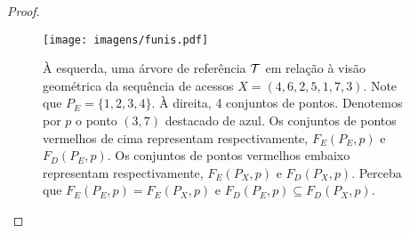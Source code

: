 \begin{proof}
\begin{comment}
            \draw[color_of_analysed_point, dashed, line width=1.5pt] (3,0) -- (3,8);
            
            
            \filldraw[black] (4,1) circle (7pt);
            \filldraw[black] (6,2) circle (7pt);
            \filldraw[red] (2,3) circle (7pt);
            \filldraw[black] (5,4) circle (7pt);
            \filldraw[red] (1,5) circle (7pt);
            \filldraw[black] (7,6) circle (7pt);
            \filldraw[color_of_analysed_point] (3,7) circle (7pt);
            \draw[black, line width=0.5pt] (0,0) rectangle (8,8);
        \end{tikzpicture}
        \begin{tikzpicture}[scale=0.45]
            \draw[very thin, gray!70] (0,0) grid (8,8);
    
            \draw[color_of_analysed_point, dashed, line width=1.5pt] (3,0) -- (3,8);
            
            
            \filldraw[red] (4,1) circle (7pt);
            \filldraw[black] (6,2) circle (7pt);
            \filldraw[black] (2,3) circle (7pt);
            \filldraw[red] (5,4) circle (7pt);
            \filldraw[black] (1,5) circle (7pt);
            \filldraw[red] (7,6) circle (7pt);
            \filldraw[color_of_analysed_point] (3,7) circle (7pt);
            \draw[black, line width=0.5pt] (0,0) rectangle (8,8);
        \end{tikzpicture} 
        \end{minipage}
        \caption{Oi}
    \end{figure}
    \end{comment}
    \begin{figure}
        \centering
        \texttt{[image: imagens/funis.pdf]}
        \caption{À esquerda, uma árvore de referência $\mathcal{T}$ em relação à visão geométrica da sequência de acessos $X = (4,6,2,5,1,7,3)$. Note que $P_E = \{1,2,3,4\}$. À direita, 4 conjuntos de pontos. Denotemos por $p$ o ponto $(3,7)$ destacado de azul. Os conjuntos de pontos vermelhos de cima representam respectivamente, $F_E(P_E,p)$ e $F_D(P_E,p)$. Os conjuntos de pontos vermelhos embaixo representam respectivamente, $F_E(P_X,p)$ e $F_D(P_X,p)$. Perceba que $F_E(P_E,p) = F_E(P_X,p)$ e $F_D(P_E,p) \subseteq F_D(P_X,p)$.}
        \label{fig:funis}
    \end{figure}


\end{proof}
